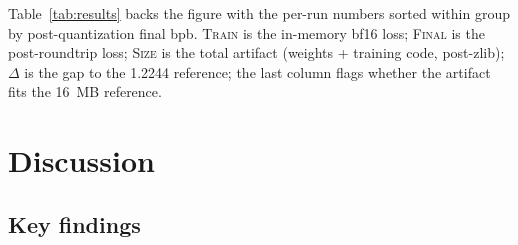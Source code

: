\documentclass[sigconf,nonacm,natbib=false]{acmart}
\renewcommand{\_}{\discretionary{\char`\_}{}{\char`\_}}
\begin{document}
Table~\ref{tab:results} backs the figure with the per-run numbers
sorted within group by post-quantization final bpb. \textsc{Train} is
the in-memory bf16 loss; \textsc{Final} is the post-roundtrip loss;
\textsc{Size} is the total artifact (weights + training code,
post-zlib); $\Delta$ is the gap to the 1.2244 reference; the last
column flags whether the artifact fits the 16~MB reference.

\begin{table}[t]
\centering
\caption{All 20{,}000-step runs at seed 1337 (where applicable),
grouped by ablation axis. ``Final'' is the post-quant zlib round-trip
bpb. ``Size'' is total submission size (weights + training code,
post-zlib). $\Delta$ is the difference vs.\ the 1.2244 reference; negative is
better.}
\label{tab:results}
\small
\setlength{\tabcolsep}{5pt}

\end{table}

\section{Discussion}

\subsection{Key findings}
\end{document}
